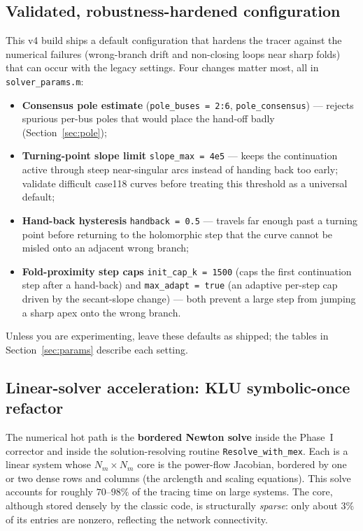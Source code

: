 \documentclass[11pt,a4paper]{article}
\newcommand{\code}[1]{\texttt{#1}}
\begin{document}
\subsection{Validated, robustness-hardened configuration}\label{sec:tuned}
This v4 build ships a default configuration that hardens the tracer
against the numerical failures (wrong-branch drift and non-closing loops near sharp folds)
that can occur with the legacy settings. Four changes matter most, all in
\code{solver_params.m}:
\begin{itemize}[leftmargin=1.4em]
  \item \textbf{Consensus pole estimate} (\code{pole_buses = 2:6}, \code{pole_consensus})
        --- rejects spurious per-bus poles that would place the hand-off badly
        (Section~\ref{sec:pole});
  \item \textbf{Turning-point slope limit} \code{slope_max = 4e5} --- keeps the
        continuation active through steep near-singular arcs instead of handing back too
        early; validate difficult case118 curves before treating this threshold as a
        universal default;
  \item \textbf{Hand-back hysteresis} \code{handback = 0.5} --- travels far enough past a
        turning point before returning to the holomorphic step that the curve cannot be
        misled onto an adjacent wrong branch;
  \item \textbf{Fold-proximity step caps} \code{init_cap_k = 1500} (caps the first
        continuation step after a hand-back) and \code{max_adapt = true} (an adaptive
        per-step cap driven by the secant-slope change) --- both prevent a large step from
        jumping a sharp apex onto the wrong branch.
\end{itemize}
Unless you are experimenting, leave these defaults as shipped; the tables in
Section~\ref{sec:params} describe each setting.

\subsection{Linear-solver acceleration: KLU symbolic-once refactor}\label{sec:klu}
The numerical hot path is the \textbf{bordered Newton solve} inside the Phase~I corrector
and inside the solution-resolving routine \code{Resolve_with_mex}. Each is a linear system
whose $N_m\times N_m$ core is the power-flow Jacobian, bordered by one or two dense rows and
columns (the arclength and scaling equations). This solve accounts for roughly
$70$--$98\%$ of the tracing time on large systems. The core, although stored densely by the
classic code, is structurally \emph{sparse}: only about $3\%$ of its entries are nonzero,
reflecting the network connectivity.
\end{document}
